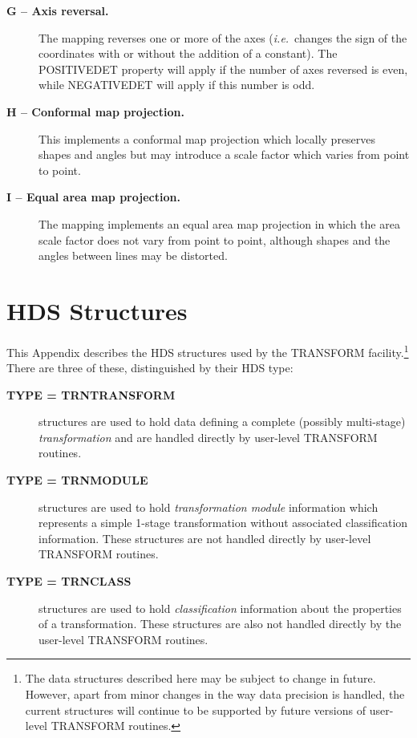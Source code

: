 \documentclass[twoside,11pt]{article}
\newcommand{\xlabel}[1]{}
\renewcommand{\_}{\texttt{\symbol{95}}}
\newcommand{\name}[1]{\mbox{\small{#1}}}
\begin{document}
\begin{description}
\item[\textbf{G -- Axis reversal.}] The mapping reverses one or more of the
axes (\emph{i.e.}\ changes the sign of the coordinates with or without the
addition of a constant).
The \name{POSITIVE\_DET} property will apply if the number of axes reversed
is even, while \name{NEGATIVE\_DET} will apply if this number is odd.

\item[\textbf{H -- Conformal map projection.}] This implements a
conformal map projection which locally preserves shapes and angles but may
introduce a scale factor which varies from point to point.

\item[\textbf{I -- Equal area map projection.}] The mapping implements an
equal area map projection in which the area scale factor does not vary from
point to point, although shapes and the angles between lines may be
distorted.

\end{description}

\newpage
\section{\xlabel{hds_structures}HDS Structures}

\label{appendix_structures}

This Appendix describes the \name{HDS} structures used by the
\name{TRANSFORM} facility.\footnote{
The data structures described here may be subject to change in future.
However, apart from minor changes in the way data precision is handled, the
current structures will continue to be supported by future versions of
user-level \name{TRANSFORM} routines.
}
There are three of these, distinguished by their HDS type:

\begin{description}

\item[\textbf{TYPE = \name{TRN\_TRANSFORM}}] structures are used to hold data
defining a complete (possibly multi-stage) \emph{transformation} and are
handled directly by user-level \name{TRANSFORM} routines.

\item[\textbf{TYPE = \name{TRN\_MODULE}}] structures are used to hold
\emph{transformation module} information which represents a simple 1-stage
transformation without associated classification information.
These structures are not handled directly by user-level \name{TRANSFORM}
routines.

\item[\textbf{TYPE = \name{TRN\_CLASS}}] structures are used to hold
{\em classification} information about the properties of a transformation.
These structures are also not handled directly by the user-level
\name{TRANSFORM} routines.

\end{description}
\end{document}
